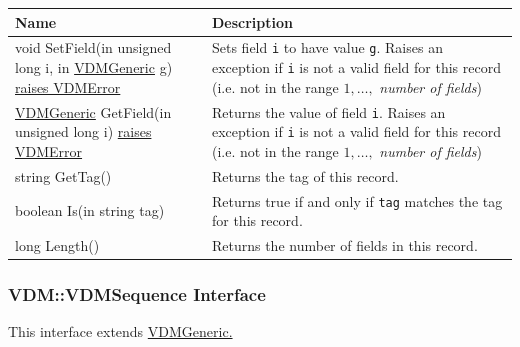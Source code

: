 \documentclass[\pformat,12pt]{article}
\newcommand{\pbs}[1]{\let\temp=\\#1\let\\=\temp}
\newenvironment{interfacetable}{%
  \begin{longtable}{|>{\pbs\raggedright\ttfamily}p{6.6cm}%
                    |>{\pbs\raggedright}p{6.6cm}|} \hline
  \textrm{\bfseries Name} &  \textbf{Description} \\ \hline
  \endhead
  }{\end{longtable}}
\newcommand{\APIError}{\hyperlink{exception.APIError}{raises APIError}}
\newcommand{\VDMError}{\hyperlink{exception.VDMError}{raises VDMError}}
\newcommand{\VDMGeneric}{\hyperlink{interface.Generic}{VDMGeneric}}
\begin{document}
\begin{interfacetable}
void SetField(in unsigned long i, in {\VDMGeneric} g) {\VDMError}
 & Sets field \texttt{i} to have value \texttt{g}. Raises an exception
   if \texttt{i} is not a valid field for this record (i.e. not in the
   range $1,\ldots,$ \textit{number of fields}) 
\\ \hline
{\VDMGeneric} GetField(in unsigned long i) {\VDMError}
 & Returns the value of field \texttt{i}. Raises an exception
   if \texttt{i} is not a valid field for this record (i.e. not in the
   range $1,\ldots,$ \textit{number of fields})
\\ \hline
string GetTag() %
 & Returns the tag of this record.
\\ \hline
boolean Is(in string tag)
 & Returns true if and only if \texttt{tag} matches the tag for this
 record. 
\\ \hline
long Length()
 & Returns the number of fields in this record.
\\ \hline
\end{interfacetable}

\subsubsection{VDM::VDMSequence Interface}
\mbox{}
This interface extends \hyperlink{interface.Generic}{VDMGeneric.}
\end{document}
